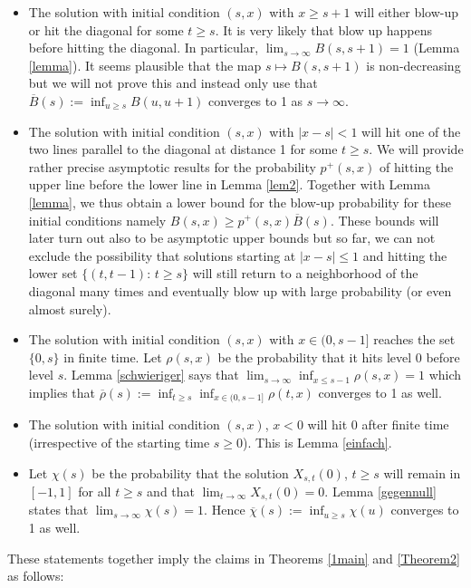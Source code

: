 \documentclass[sn-mathphys-num]{sn-jnl}
\theoremstyle{definition}
\numberwithin{equation}{section} \theoremstyle{remark}
\newcommand{\1}{\mathbbm{1}}
\renewcommand{\bar}{\overline}
\begin{document}
\begin{itemize}
\item The solution with initial condition $(s,x)$ with $x\geq s+1$
  will either blow-up or hit the diagonal for some $t \geq s$. It is
  very likely that blow up happens before hitting the diagonal.  In
  particular, $\lim_{s \to \infty}B(s,s+1)=1$ (Lemma \ref{lemma}). It
  seems plausible that the map $s \mapsto B(s,s+1)$ is non-decreasing
  but we will not prove this and instead only use that
  $\bar B(s):=\inf_{u \geq s}B(u,u+1)$ converges to 1 as
  $s \to \infty$.
\item The solution with initial condition $(s,x)$ with $|x-s|< 1$ will
  hit one of the two lines parallel to the diagonal at distance 1 for
  some $t \geq s$.  We will provide rather precise asymptotic results
  for the probability $p^+(s,x)$ of hitting the upper line before the
  lower line in Lemma \ref{lem2}. Together with Lemma \ref{lemma}, we
  thus obtain a lower bound for the blow-up probability for these
  initial conditions namely $B(s,x) \geq p^+(s,x)\bar B(s)$. These
  bounds will later turn out also to be asymptotic upper bounds but so
  far, we can not exclude the possibility that solutions starting at
  $|x-s|\leq 1$ and hitting the lower set $\{(t,t-1):\,t \geq s\}$
  will still return to a neighborhood of the diagonal many times and
  eventually blow up with large probability (or even almost surely).
\item The solution with initial condition $(s,x)$ with $x \in (0,s-1]$
  reaches the set $\{0,s\}$ in finite time. Let $\rho(s,x)$ be the
  probability that it hits level 0 before level $s$. Lemma
  \ref{schwieriger} says that
  $\lim_{s \to \infty}\inf_{x \leq s-1}\rho(s,x)=1$ which implies that
  $\bar \rho(s):= \inf_{t \geq s}\inf_{x \in (0,s-1]}\rho(t,x)$
  converges to 1 as well.

\item The solution with initial condition $(s,x)$, $x <0$ will hit $0$
  after finite time (irrespective of the starting time $s\geq
  0$). This is Lemma \ref{einfach}.
    \item  Let $\chi(s)$ be the probability that the solution $X_{s,t}(0)$, $t \geq s$ %
      will remain in $[-1,1]$ for all $t \geq s$ and that
      $\lim_{t \to \infty}X_{s,t}(0)=0$. Lemma \ref{gegennull} states that $\lim_{s \to \infty}\chi(s)=1$. Hence $\bar \chi(s):=\inf_{u \geq s}\chi(u)$ converges to 1 as well.
    \end{itemize}
      These statements together imply the claims in Theorems \ref{1main} and \ref{Theorem2} as follows:
\end{document}
